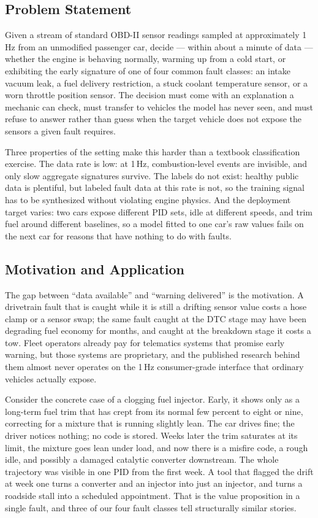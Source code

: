 \subsection{Problem Statement}

Given a stream of standard OBD-II sensor readings sampled at approximately
1\,Hz from an unmodified passenger car, decide --- within about a minute of
data --- whether the engine is behaving normally, warming up from a cold
start, or exhibiting the early signature of one of four common fault classes:
an intake vacuum leak, a fuel delivery restriction, a stuck coolant
temperature sensor, or a worn throttle position sensor. The decision must
come with an explanation a mechanic can check, must transfer to vehicles the
model has never seen, and must refuse to answer rather than guess when the
target vehicle does not expose the sensors a given fault requires.

Three properties of the setting make this harder than a textbook
classification exercise. The data rate is low: at 1\,Hz, combustion-level
events are invisible, and only slow aggregate signatures survive. The
labels do not exist: healthy public data is plentiful, but labeled fault
data at this rate is not, so the training signal has to be synthesized
without violating engine physics. And the deployment target varies: two cars
expose different PID sets, idle at different speeds, and trim fuel around
different baselines, so a model fitted to one car's raw values fails on the
next car for reasons that have nothing to do with faults.

\subsection{Motivation and Application}

The gap between ``data available'' and ``warning delivered'' is the
motivation. A drivetrain fault that is caught while it is still a drifting
sensor value costs a hose clamp or a sensor swap; the same fault caught at
the DTC stage may have been degrading fuel economy for months, and caught at
the breakdown stage it costs a tow. Fleet operators already pay for
telematics systems that promise early warning, but those systems are
proprietary, and the published research behind them almost never operates on
the 1\,Hz consumer-grade interface that ordinary vehicles actually expose.

Consider the concrete case of a clogging fuel injector. Early, it shows only
as a long-term fuel trim that has crept from its normal few percent to eight
or nine, correcting for a mixture that is running slightly lean. The car
drives fine; the driver notices nothing; no code is stored. Weeks later the
trim saturates at its limit, the mixture goes lean under load, and now there
is a misfire code, a rough idle, and possibly a damaged catalytic converter
downstream. The whole trajectory was visible in one PID from the first week.
A tool that flagged the drift at week one turns a converter and an injector
into just an injector, and turns a roadside stall into a scheduled
appointment. That is the value proposition in a single fault, and three of
our four fault classes tell structurally similar stories.

